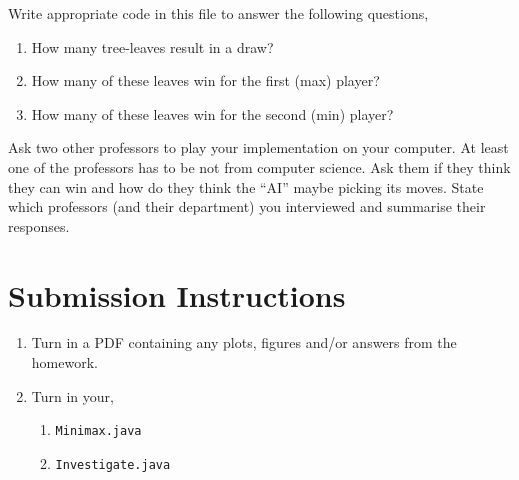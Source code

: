 \documentclass{homework}
\begin{document}
Write appropriate code in this file to answer the following questions,

\begin{enumerate}
  \item How many tree-leaves result in a draw?
  \item How many of these leaves  win for the first (max) player?
  \item How many of these leaves win for the second (min) player?
\end{enumerate}

\question Ask two other professors to play your implementation on your
computer.  At least one of the professors has to be not from computer
science.  Ask them if they think they can win and how do they think
the ``AI'' maybe picking its moves.  State which professors (and their
department) you interviewed and summarise their responses.

\section*{Submission Instructions}

\begin{enumerate}
  \item Turn in a PDF containing any plots, figures and/or answers from the homework.
  \item Turn in your,
        \begin{enumerate}[label=\roman*)]
          \item \texttt{Minimax.java}
          \item \texttt{Investigate.java}
        \end{enumerate}
\end{enumerate}
\end{document}
